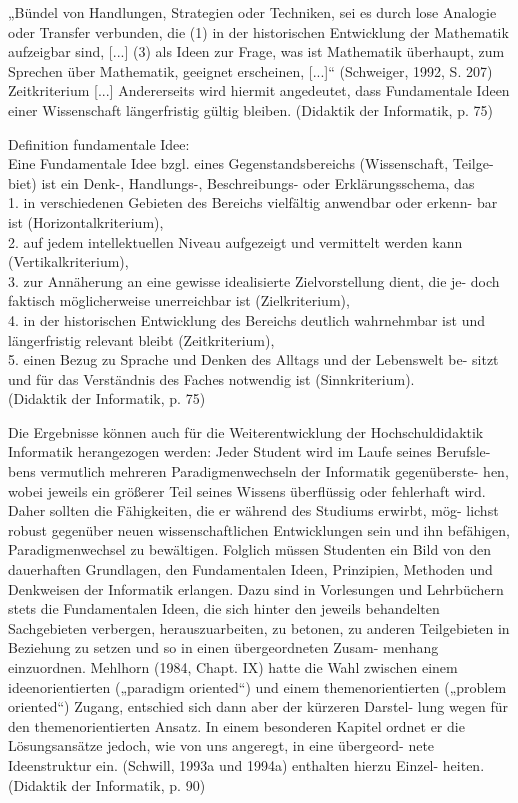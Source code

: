 „Bündel von Handlungen, Strategien oder Techniken, sei es durch lose Analogie oder 
Transfer verbunden, die 
(1) in der historischen Entwicklung der Mathematik aufzeigbar sind, [...] 
(3) als Ideen zur Frage, was ist Mathematik überhaupt, zum Sprechen über Mathematik, 
geeignet erscheinen, [...]“ (Schweiger, 1992, S. 207) \\
Zeitkriterium [...] Andererseits  wird  hiermit  angedeutet,  dass  Fundamentale  Ideen 
einer Wissenschaft längerfristig gültig bleiben. 
(Didaktik der Informatik, p. 75)

Definition fundamentale Idee:\\
Eine  Fundamentale  Idee  bzgl.  eines  Gegenstandsbereichs  (Wissenschaft,  Teilge-
biet) ist ein Denk-, Handlungs-, Beschreibungs- oder Erklärungsschema, das \\
1.  in verschiedenen Gebieten des Bereichs vielfältig anwendbar oder erkenn-
bar ist (Horizontalkriterium), \\
2. auf  jedem  intellektuellen  Niveau  aufgezeigt  und  vermittelt  werden  kann 
(Vertikalkriterium), \\
3. zur  Annäherung  an  eine  gewisse  idealisierte  Zielvorstellung  dient,  die  je-
doch faktisch möglicherweise unerreichbar ist (Zielkriterium), \\
4. in der historischen Entwicklung des Bereichs deutlich wahrnehmbar ist und 
längerfristig relevant bleibt (Zeitkriterium), \\
5. einen Bezug zu Sprache und Denken des Alltags und der Lebenswelt be-
sitzt und für das Verständnis des Faches notwendig ist (Sinnkriterium). \\
(Didaktik der Informatik, p. 75)

Die  Ergebnisse  können  auch  für  die  Weiterentwicklung  der  Hochschuldidaktik 
Informatik herangezogen werden: Jeder Student wird im Laufe seines Berufsle-
bens vermutlich mehreren Paradigmenwechseln der Informatik gegenüberste-
hen, wobei jeweils ein größerer Teil seines Wissens überflüssig oder fehlerhaft 
wird. Daher sollten die Fähigkeiten, die er während des Studiums erwirbt, mög-
lichst robust gegenüber neuen wissenschaftlichen Entwicklungen sein und ihn 
befähigen,  Paradigmenwechsel  zu  bewältigen.  Folglich  müssen  Studenten  ein 
Bild von den dauerhaften Grundlagen, den Fundamentalen Ideen, Prinzipien, 
Methoden und Denkweisen der Informatik erlangen. Dazu sind in Vorlesungen 
und  Lehrbüchern  stets  die  Fundamentalen  Ideen,  die  sich  hinter  den  jeweils 
behandelten Sachgebieten verbergen, herauszuarbeiten, zu betonen, zu anderen 
Teilgebieten in Beziehung zu setzen und so in einen übergeordneten Zusam-
menhang  einzuordnen.  Mehlhorn  (1984,  Chapt. IX)  hatte  die  Wahl  zwischen 
einem  ideenorientierten  („paradigm  oriented“)  und  einem  themenorientierten 
(„problem oriented“) Zugang, entschied sich dann aber der kürzeren Darstel-
lung wegen für den themenorientierten Ansatz. In einem besonderen Kapitel 
ordnet er die Lösungsansätze jedoch, wie von uns angeregt, in eine übergeord-
nete  Ideenstruktur  ein.  (Schwill,  1993a  und  1994a)  enthalten  hierzu  Einzel-
heiten. 
(Didaktik der Informatik, p. 90)